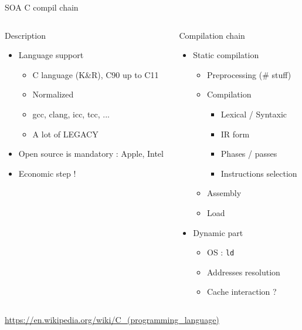 %
\begin{Frame}{SOA C compil chain}
  \begin{columns}[t]
    \begin{column}{\BW} %
      \begin{block}{Description}
        \begin{itemize}
        \item Language support
          \begin{itemize}
          \item C language (K\&R), C90 up to C11
          \item Normalized
          \item gcc, clang, icc, tcc, ...
          \item A lot of LEGACY
          \end{itemize}
        \item Open source is mandatory : Apple, Intel
        \item Economic step !
        \end{itemize}
      \end{block}
    \end{column}
    \begin{column}{\BW} %
      \begin{block}{Compilation chain}
        \begin{itemize}
        \item Static compilation
          \begin{itemize}
          \item Preprocessing (\# stuff)
          \item Compilation
            \begin{itemize}
            \item Lexical / Syntaxic
            \item IR form
            \item Phases / passes
            \item Instructions selection
            \end{itemize}
          \item Assembly
          \item Load
          \end{itemize}
        \item Dynamic part
          \begin{itemize}
          \item OS : \texttt{ld}
          \item Addresses resolution
          \item Cache interaction ?
          \end{itemize}
        \end{itemize}
      \end{block}
    \end{column}
  \end{columns}
  \url{https://en.wikipedia.org/wiki/C_(programming_language)}
\end{Frame}

